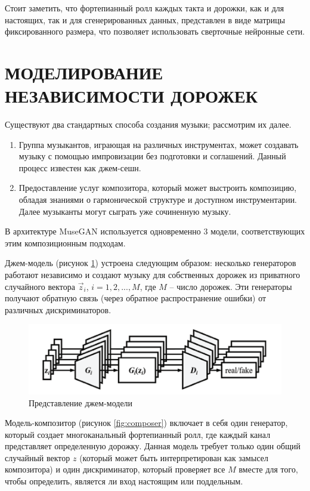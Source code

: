     Стоит заметить, что фортепианный ролл каждых такта и дорожки, как и для настоящих, так и для сгенерированных данных, представлен в виде матрицы фиксированного размера, что позволяет использовать сверточные нейронные сети.

\section{МОДЕЛИРОВАНИЕ НЕЗАВИСИМОСТИ ДОРОЖЕК}

    Существуют два стандартных способа создания музыки; рассмотрим их далее.
    \begin{enumerate}  
    \item Группа музыкантов, играющая на различных инструментах, может создавать музыку с помощью импровизации без подготовки и соглашений. Данный процесс известен как джем-сешн.
    \item Предоставление услуг композитора, который может выстроить композицию, обладая знаниями о гармонической структуре и доступном инструментарии. Далее музыканты могут сыграть уже сочиненную музыку.
    \end{enumerate}
    
    В архитектуре MuseGAN используется одновременно 3 модели, соответствующих этим композиционным подходам.
    
    Джем-модель (рисунок \ref{fig:jam}) устроена следующим образом: несколько генераторов работают независимо и создают музыку для собственных дорожек из приватного случайного вектора $\vec{z}_i $, $i=1,2,...,M$, где $M$ -- число дорожек. Эти генераторы получают обратную связь (через обратное распространение ошибки) от различных дискриминаторов.
    
    \begin{figure}
        \centering
        \includegraphics[scale=0.4]{tex/png/jamm.png}
        \caption{Представление джем-модели \cite{musegan}}
        \label{fig:jam}
    \end{figure}
    
    Модель-композитор (рисунок \ref{fig:composer}) включает в себя один генератор, который создает многоканальный фортепианный ролл, где каждый канал представляет определенную дорожку. 
    Данная модель требует только один общий случайный вектор $z$ (который может быть интерпретирован как замысел композитора) и один дискриминатор, который проверяет все $M$ вместе для того, чтобы определить, является ли вход настоящим или поддельным.
    
